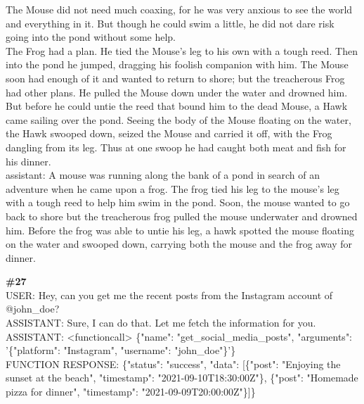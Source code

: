 \documentclass[10pt]{article}
\begin{document}
\begin{Form}
\begin{tcolorbox}[colback=convbg,colframe=itemframe,boxrule=0.8pt,arc=2pt,breakable,left=6pt,right=6pt,top=5pt,bottom=5pt]
{The Mouse did not need much coaxing, for he was very anxious to see the world and everything in it. But though he could swim a little, he did not dare risk going into the pond without some help. \\[2pt]
The Frog had a plan. He tied the Mouse's leg to his own with a tough reed. Then into the pond he jumped, dragging his foolish companion with him. The Mouse soon had enough of it and wanted to return to shore; but the treacherous Frog had other plans. He pulled the Mouse down under the water and drowned him. But before he could untie the reed that bound him to the dead Mouse, a Hawk came sailing over the pond. Seeing the body of the Mouse floating on the water, the Hawk swooped down, seized the Mouse and carried it off, with the Frog dangling from its leg. Thus at one swoop he had caught both meat and fish for his dinner. \\[2pt]
assistant: A mouse was running along the bank of a pond in search of an adventure when he came upon a frog. The frog tied his leg to the mouse's leg with a tough reed to help him swim in the pond. Soon, the mouse wanted to go back to shore but the treacherous frog pulled the mouse underwater and drowned him. Before the frog was able to untie his leg, a hawk spotted the mouse floating on the water and swooped down, carrying both the mouse and the frog away for dinner.}
\end{tcolorbox}
\vspace{-1pt}
\CheckBox[name=q26c,width=1.6ex,height=1.6ex,bordercolor={0.45 0.45 0.45}]{~\textcolor{cbox}{COMPACT}}\quad
\CheckBox[name=q26d,width=1.6ex,height=1.6ex,bordercolor={0.45 0.45 0.45}]{~\textcolor{dbox}{DIFFUSE}}\quad
\CheckBox[name=q26n,width=1.6ex,height=1.6ex,bordercolor={0.45 0.45 0.45}]{~\textcolor{nbox}{NONE}}
\vspace{8pt}
\begin{tcolorbox}[colback=convbg,colframe=itemframe,boxrule=0.8pt,arc=2pt,breakable,left=6pt,right=6pt,top=5pt,bottom=5pt]
{\footnotesize\textbf{\#27}}\\[3pt]
{\footnotesize USER: Hey, can you get me the recent posts from the Instagram account of @john\_doe? \\[2pt]
ASSISTANT: Sure, I can do that. Let me fetch the information for you.   \\[2pt]
ASSISTANT: <functioncall> \{"name": "get\_social\_media\_posts", "arguments": '\{"platform": "Instagram", "username": "john\_doe"\}'\}   \\[2pt]
FUNCTION RESPONSE: \{"status": "success", "data": [\{"post": "Enjoying the sunset at the beach", "timestamp": "2021-09-10T18:30:00Z"\}, \{"post": "Homemade pizza for dinner", "timestamp": "2021-09-09T20:00:00Z"\}]\} \\[2pt]
}
\end{tcolorbox}
\end{Form}
\end{document}
